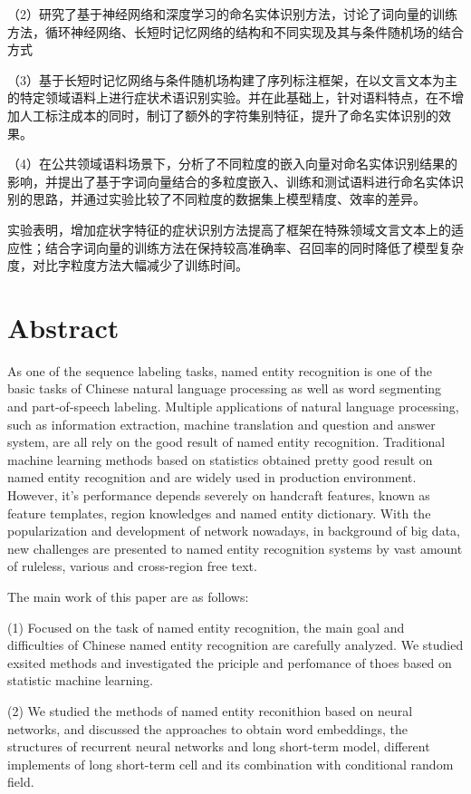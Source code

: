 （2）研究了基于神经网络和深度学习的命名实体识别方法，讨论了词向量的训练方法，循环神经网络、长短时记忆网络的结构和不同实现及其与条件随机场的结合方式

（3）基于长短时记忆网络与条件随机场构建了序列标注框架，在以文言文本为主的特定领域语料上进行症状术语识别实验。并在此基础上，针对语料特点，在不增加人工标注成本的同时，制订了额外的字符集别特征，提升了命名实体识别的效果。

（4）在公共领域语料场景下，分析了不同粒度的嵌入向量对命名实体识别结果的影响，并提出了基于字词向量结合的多粒度嵌入、训练和测试语料进行命名实体识别的思路，并通过实验比较了不同粒度的数据集上模型精度、效率的差异。

实验表明，增加症状字特征的症状识别方法提高了框架在特殊领域文言文本上的适应性；结合字词向量的训练方法在保持较高准确率、召回率的同时降低了模型复杂度，对比字粒度方法大幅减少了训练时间。
\chapter{Abstract}
As one of the sequence labeling tasks, named entity recognition is one of the basic tasks of Chinese natural language processing as well as word segmenting and part-of-speech labeling.
Multiple applications of natural language processing, such as information extraction, machine translation and question and answer system, are all rely on the good result of named entity recognition.
Traditional machine learning methods based on statistics obtained pretty good result on named entity recognition and are widely used in production environment.
However, it's performance depends severely on handcraft features, known as feature templates, region knowledges and named entity dictionary.
With the popularization and development of network nowadays, in background of big data, new challenges are presented to named entity recognition systems by vast amount of ruleless, various and cross-region free text.

The main work of this paper are as follows:

(1) Focused on the task of named entity recognition, the main goal and difficulties of Chinese named entity recognition are carefully analyzed. We studied exsited methods and investigated the priciple and perfomance of thoes based on statistic machine learning.

(2) We studied the methods of named entity reconithion based on neural networks, and discussed the approaches to obtain word embeddings, the structures of recurrent neural networks and long short-term model, different implements of long short-term cell and its combination with conditional random field.

